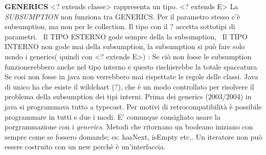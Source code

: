 \noindent \textbf{GENERICS}\newline
<? extends classe> rappresenta un tipo. \newline
<? extends E> \newline
La \textit{SUBSUMPTION} non funziona tra GENERICS. Per il parametro stesso c'è subsumption, ma non per le collection. Il tipo con il ? accetta sottotipi di parametri.\newline
\textbullet\ Il TIPO ESTERNO gode sempre della la subsumption, 
\textbullet\ Il TIPO INTERNO non gode mai della subsumption, la subsumption si può fare solo usndo i generics( quindi con <? extends E>)  : Se ciò non fosse le subsumption funzionerebbero anche nel tipo interno e questo rischierebbe la totale spaccatura \newline
Se cosi non fosse in java non verrebbero mai rispettate le regole delle classi. \newline
Java di unico ha che esiste il wildchart (?), che è un modo controllato per risolvere il problema della subsumption dei tipi interni. \newline
Prima dei generics (2003/2004) in java si programmava tutto a typecast. Per motivi di retrocompatibilità è possibile programmare in tutti e due i modi. E' comunque consigliato usare la porgrammazione con i \textit{generics}. \newline
Metodi che ritornano un booleano iniziano con sempre come se fossero domande; es: hasNext, isEmpty etc.. \newline
Un iteratore non può essere costruito con un new perchè è un'interfaccia. 
\newpage
